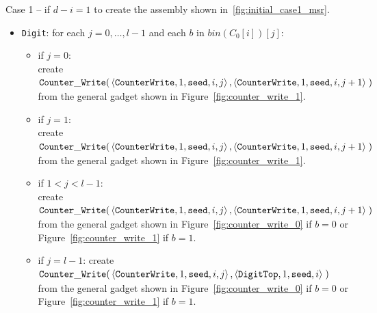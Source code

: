Case 1 -- if $d - i = 1$ to create the assembly shown in~\ref{fig:initial_case1_msr}.
\begin{itemize}
    \item {\tt Digit}: for each $j=0,\ldots,l-1$ and each $b$ in $bin(C_0[i])[j]$:
    \begin{itemize}
        \item if $j = 0$:\\ create
        $\begin{aligned}[t]
            {\tt Counter\_Write}(&\left\langle {\tt CounterWrite}, 1, {\tt seed}, i, j \right\rangle, \left\langle {\tt CounterWrite}, 1, {\tt seed}, i, j + 1 \right\rangle \;)
        \end{aligned}$\\from the general gadget shown in Figure~\ref{fig:counter_write_1}.

        \item if $j = 1$:\\ create
        $\begin{aligned}[t]
            {\tt Counter\_Write}(&\left\langle {\tt CounterWrite}, 1, {\tt seed}, i, j \right\rangle, \left\langle {\tt CounterWrite}, 1, {\tt seed}, i, j + 1 \right\rangle \;)
        \end{aligned}$\\from the general gadget shown in Figure~\ref{fig:counter_write_1}.

        \item if $1 < j < l - 1$:\\ create
        $\begin{aligned}[t]
            {\tt Counter\_Write}(&\left\langle {\tt CounterWrite}, 1, {\tt seed}, i, j \right\rangle, \left\langle {\tt CounterWrite}, 1, {\tt seed}, i, j + 1 \right\rangle \;)
        \end{aligned}$\\from the general gadget shown in Figure~\ref{fig:counter_write_0} if $b = 0$ or Figure~\ref{fig:counter_write_1} if $b = 1$.

        \item if $j = l-1$: create
        $\begin{aligned}[t]
            {\tt Counter\_Write}(&\left\langle {\tt CounterWrite}, 1, {\tt seed}, i, j \right\rangle, \left\langle {\tt DigitTop}, 1, {\tt seed}, i \right\rangle \;)
        \end{aligned}$\\from the general gadget shown in Figure~\ref{fig:counter_write_0} if $b = 0$ or Figure~\ref{fig:counter_write_1} if $b = 1$.
    \end{itemize}


\end{itemize}
